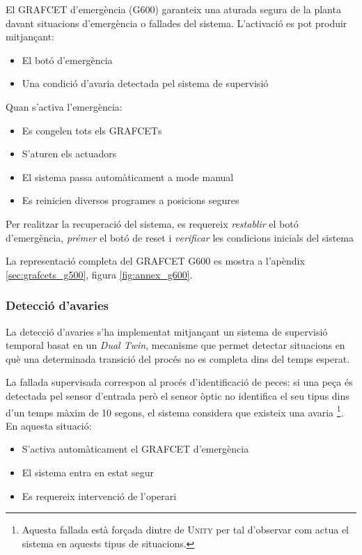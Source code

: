 \documentclass[a4paper,11pt,DIV=13,headings=normal,abstract=true,twoside=semi]{article}
\newcommand{\acro}[1]{\textsc{#1}}
\begin{document}
El \acro{GRAFCET} d'emergència (G600) garanteix una aturada segura de la planta davant situacions d'emergència o fallades del sistema. L'activació es pot produir mitjançant:
\begin{itemize}
\item El botó d'emergència
\item Una condició d'avaria detectada pel sistema de supervisió
\end{itemize}

Quan s'activa l'emergència:
\begin{itemize}
\item Es congelen tots els \acro{GRAFCET}s
\item S'aturen els actuadors
\item El sistema passa automàticament a mode manual
\item Es reinicien diversos programes a posicions segures
\end{itemize}

Per realitzar la recuperació del sistema, es requereix \emph{restablir} el botó d'emergència, \emph{prémer} el botó de reset i \emph{verificar} les condicions inicials del sistema

La representació completa del \acro{GRAFCET} G600 es mostra a l'apèndix \ref{sec:grafcets_g500}, figura \ref{fig:annex_g600}.

\subsubsection{Detecció d'avaries}

La detecció d'avaries s'ha implementat mitjançant un sistema de supervisió temporal basat en un \emph{Dual Twin}, mecanisme que permet detectar situacions en què una determinada transició del procés no es completa dins del temps esperat.

La fallada supervisada correspon al procés d'identificació de peces: si una peça és detectada pel sensor d'entrada però el sensor òptic no identifica el seu tipus dins d'un temps màxim de 10 segons, el sistema considera que existeix una avaria \footnote{Aquesta fallada està forçada dintre de \acro{Unity} per tal d'observar com actua el sistema en aquests tipus de situacions.}. En aquesta situació:
\begin{itemize}
\item S'activa automàticament el \acro{GRAFCET} d'emergència
\item El sistema entra en estat segur
\item Es requereix intervenció de l'operari
\end{itemize}
\end{document}
